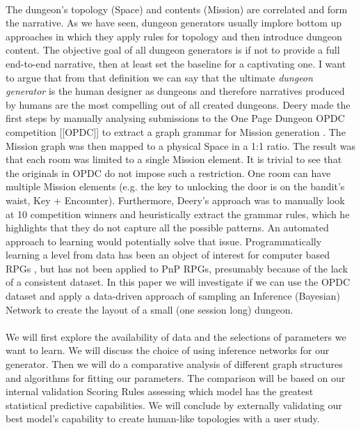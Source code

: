 \documentclass{UoYCSproject}
\begin{document}
\paragraph{}
The dungeon’s topology (Space) and contents (Mission) are correlated and form the narrative. As we have seen, dungeon generators usually implore bottom up approaches in which they apply rules for topology and then introduce dungeon content. The objective goal of all dungeon generators is if not to provide a full end-to-end narrative, then at least set the baseline for a captivating one. I want to argue that from that definition we can say that the ultimate \textit{dungeon generator} is the human designer as dungeons and therefore narratives produced by humans are the most compelling out of all created dungeons. Deery made the first steps by manually analysing submissions to the One Page Dungeon OPDC competition [[OPDC]] to extract a graph grammar for Mission generation \parencite{Deery}. The Mission graph was then mapped to a physical Space in a 1:1 ratio. The result was that each room was limited to a single Mission element. It is trivial to see that the originals in OPDC do not impose such a restriction. One room can have multiple Mission elements (e.g. the key to unlocking the door is on the bandit’s waist, Key + Encounter). Furthermore, Deery’s approach was to manually look at 10 competition winners and heuristically extract the grammar rules, which he highlights that they do not capture all the possible patterns. An automated approach to learning would potentially solve that issue. Programmatically learning a level from data has been an object of interest for computer based RPGs \parencite{SummervilleLearningOfZelda}, but has not been applied to PnP RPGs, presumably because of the lack of a consistent dataset. In this paper we will investigate if we can use the OPDC dataset and apply a data-driven approach of sampling an Inference (Bayesian) Network to create the layout of a small (one session long) dungeon.

\paragraph{}
We will first explore the availability of data and the selections of parameters we want to learn. We will discuss the choice of using inference networks for our generator. Then we will do a comparative analysis of different graph structures and algorithms for fitting our parameters. The comparison will be based on our internal validation Scoring Rules \parencite{PearlScoringRules} assessing which model has the greatest statistical predictive capabilities. We will conclude by externally validating our best model’s capability to create human-like topologies with a user study.
\end{document}
